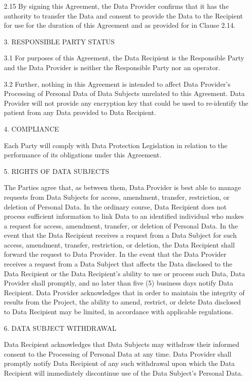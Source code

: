 \documentclass[12pt,letterpaper]{article}
\begin{document}
2.15	By signing this Agreement, the Data Provider confirms that it has the authority to transfer the Data and consent to provide the Data to the Recipient for use for the duration of this Agreement and as provided for in Clause 2.14.

3.	RESPONSIBLE PARTY STATUS	

3.1	For purposes of this Agreement, the Data Recipient is the Responsible Party and the Data Provider is neither the Responsible Party nor an operator. 

3.2	Further, nothing in this Agreement is intended to affect Data Provider’s Processing of Personal Data of Data Subjects unrelated to this Agreement.  Data Provider will not provide any encryption key that could be used to re-identify the patient from any Data provided to Data Recipient.

4.	COMPLIANCE	

Each Party will comply with Data Protection Legislation in relation to the performance of its obligations under this Agreement.

5.	RIGHTS OF DATA SUBJECTS	 

The Parties agree that, as between them, Data Provider is best able to manage requests from Data Subjects for access, amendment, transfer, restriction, or deletion of Personal Data.  In the ordinary course, Data Recipient does not process sufficient information to link Data to an identified individual who makes a request for access, amendment, transfer, or deletion of Personal Data.  In the event that the Data Recipient receives a request from a Data Subject for such access, amendment, transfer, restriction, or deletion, the Data Recipient shall forward the request to Data Provider.  In the event that the Data Provider receives a request from a Data Subject that affects the Data disclosed to the Data Recipient or the Data Recipient’s ability to use or process such Data, Data Provider shall promptly, and no later than five (5) business days notify Data Recipient. Data Provider acknowledges that in order to maintain the integrity of results from the Project, the ability to amend, restrict, or delete Data disclosed to Data Recipient may be limited, in accordance with applicable regulations.

6.	DATA SUBJECT WITHDRAWAL	

Data Recipient acknowledges that Data Subjects may withdraw their informed consent to the Processing of Personal Data at any time.  Data Provider shall promptly notify Data Recipient of any such withdrawal upon which the Data Recipient will immediately discontinue use of the Data Subject’s Personal Data.
\end{document}
